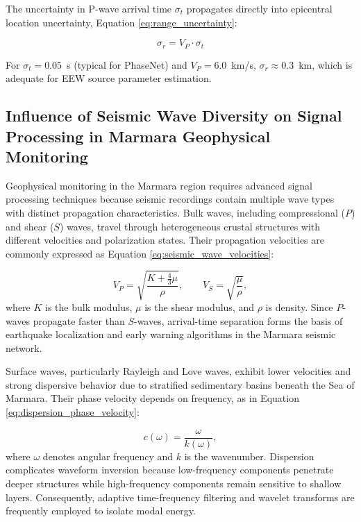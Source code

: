 \documentclass[data,article,accept,pdftex,moreauthors]{Definitions/mdpi}
\begin{document}
The uncertainty in P-wave arrival time $\sigma_t$ propagates directly into epicentral location uncertainty, Equation \eqref{eq:range_uncertainty}:

\begin{equation}
\label{eq:range_uncertainty}
\sigma_r = V_P \cdot \sigma_t
\end{equation}

For $\sigma_t = 0.05$~s (typical for PhaseNet) and $V_P = 6.0$~km/s, $\sigma_r \approx 0.3$~km, which is adequate for EEW source parameter estimation.

\subsection{Influence of Seismic Wave Diversity on Signal Processing in Marmara Geophysical Monitoring}

Geophysical monitoring in the Marmara region requires advanced signal processing techniques because seismic recordings contain multiple wave types with distinct propagation characteristics. Bulk waves, including compressional ($P$) and shear ($S$) waves, travel through heterogeneous crustal structures with different velocities and polarization states. Their propagation velocities are commonly expressed as Equation \eqref{eq:seismic_wave_velocities}:

\begin{equation}
\label{eq:seismic_wave_velocities}
V_P = \sqrt{\frac{K + \frac{4}{3}\mu}{\rho}},
\qquad
V_S = \sqrt{\frac{\mu}{\rho}},
\end{equation}
where $K$ is the bulk modulus, $\mu$ is the shear modulus, and $\rho$ is density. Since $P$-waves propagate faster than $S$-waves, arrival-time separation forms the basis of earthquake localization and early warning algorithms in the Marmara seismic network.

Surface waves, particularly Rayleigh and Love waves, exhibit lower velocities and strong dispersive behavior due to stratified sedimentary basins beneath the Sea of Marmara. Their phase velocity depends on frequency, as in Equation \eqref{eq:dispersion_phase_velocity}:

\begin{equation}
\label{eq:dispersion_phase_velocity}
c(\omega) = \frac{\omega}{k(\omega)},
\end{equation}
where $\omega$ denotes angular frequency and $k$ is the wavenumber. Dispersion complicates waveform inversion because low-frequency components penetrate deeper structures while high-frequency components remain sensitive to shallow layers. Consequently, adaptive time-frequency filtering and wavelet transforms are frequently employed to isolate \linebreak modal energy.
\end{document}
